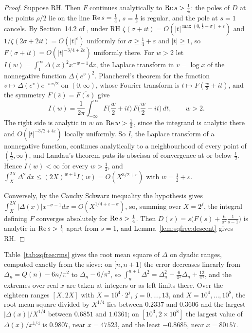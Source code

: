 \begin{proof}
Suppose RH. Then $F$ continues analytically to $\operatorname{Re} s>\frac14$: the poles of $D$ at the points $\rho/2$ lie on the line $\operatorname{Re} s=\frac14$, $s=\frac12$ is regular, and the pole at $s=1$ cancels. By Section~14.2 of \cite{Titchmarsh}, under RH $\zeta(\sigma+it)=O(|t|^{\max(0,\frac12-\sigma)+\varepsilon})$ and $1/\zeta(2\sigma+2it)=O(|t|^\varepsilon)$ uniformly for $\sigma\ge\frac14+\varepsilon$ and $|t|\ge1$, so $F(\sigma+it)=O(|t|^{-3/4+2\varepsilon})$ uniformly there. For $w>2$ let $I(w)=\int_1^\infty\Delta(x)^2x^{-w-1}dx$, the Laplace transform in $v=\log x$ of the nonnegative function $\Delta(e^v)^2$. Plancherel's theorem for the function $v\mapsto\Delta(e^v)e^{-wv/2}$ on $(0,\infty)$, whose Fourier transform is $t\mapsto F(\frac w2+it)$, and the symmetry $F(\bar s)=\overline{F(s)}$ give
\[
I(w)=\frac1{2\pi}\int_{-\infty}^\infty F\Big(\frac w2+it\Big)\,F\Big(\frac w2-it\Big)\,dt,\qquad w>2 .
\]
The right side is analytic in $w$ on $\operatorname{Re} w>\frac12$, since the integrand is analytic there and $O(|t|^{-3/2+4\varepsilon})$ locally uniformly. So $I$, the Laplace transform of a nonnegative function, continues analytically to a neighbourhood of every point of $(\frac12,\infty)$, and Landau's theorem \cite[Chapter~II, Theorem~5b]{Widder41} puts its abscissa of convergence at or below $\frac12$. Hence $I(w)<\infty$ for every $w>\frac12$, and $\int_X^{2X}\Delta^2\,dx\le(2X)^{w+1}I(w)=O(X^{3/2+\varepsilon})$ with $w=\frac12+\varepsilon$.

Conversely, by the Cauchy Schwarz inequality the hypothesis gives $\int_X^{2X}|\Delta(x)|x^{-\sigma-1}dx=O(X^{1/4+\varepsilon-\sigma})$, so, summing over $X=2^j$, the integral defining $F$ converges absolutely for $\operatorname{Re} s>\frac14$. Then $D(s)=s\big(F(s)+\frac6{\pi^2}\frac1{s-1}\big)$ is analytic in $\operatorname{Re} s>\frac14$ apart from $s=1$, and Lemma~\ref{lem:sqfree:descent} gives RH.
\end{proof}

Table~\ref{tab:sqfree:rms} gives the root mean square of $\Delta$ on dyadic ranges, computed exactly from the sieve: on $[n,n+1)$ the error decreases linearly from $\Delta_n=Q(n)-6n/\pi^2$ to $\Delta_n-6/\pi^2$, so $\int_n^{n+1}\Delta^2=\Delta_n^2-\frac6{\pi^2}\Delta_n+\frac{12}{\pi^4}$, and the extremes over real $x$ are taken at integers or as left limits there. Over the eighteen ranges $[X,2X]$ with $X=10^4\cdot2^j$, $j=0,\dots,13$, and $X=10^4,\dots,10^8$, the root mean square divided by $X^{1/4}$ lies between $0.2337$ and $0.3606$ and the largest $|\Delta(x)|/X^{1/4}$ between $0.6851$ and $1.0361$; on $[10^3,2\times10^8]$ the largest value of $\Delta(x)/x^{1/4}$ is $0.9807$, near $x=47523$, and the least $-0.8685$, near $x=80157$.

